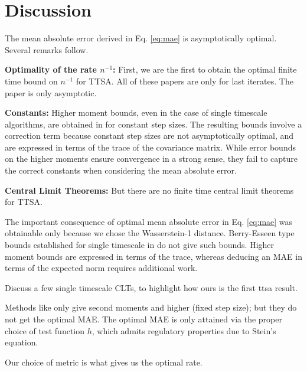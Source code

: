\section{Discussion}
The mean absolute error derived in Eq. \eqref{eq:mae} is asymptotically optimal. 
Several remarks follow. 


\textbf{Optimality of the rate $n^{-1}$:} %
First, we are the first to obtain the optimal finite time bound on $n^{-1}$ for TTSA. 
All of these papers \citep{kaledin2020finite,dalal2018finite} are only for last iterates. 
The paper \citep{mokkadem2006convergence} is only asymptotic. 


\textbf{Constants:} %
Higher moment bounds, even in the case of single timescale algorithms, are obtained in \citep{srikant2019,wainwrightBartlettJordan,durmus2024finite} for constant step sizes. 
The resulting bounds involve a correction term because constant step sizes are not asymptotically optimal, and are expressed in terms of the trace of the covariance matrix. 
While error bounds on the higher moments ensure convergence in a strong sense, they fail to capture the correct constants when considering the mean absolute error. 



\textbf{Central Limit Theorems:} %
But there are no finite time central limit theorems for TTSA.
\citet{samsonov2024gaussian,srikant2024CLT}


The important consequence of optimal mean absolute error in Eq. \eqref{eq:mae} was obtainable only because we chose the Wasserstein-1 distance. 
Berry-Esseen type bounds established for single timescale in \citep{samsonov2024gaussian} do not give such bounds. 
Higher moment bounds \citep{durmus2024finite} are expressed in terms of the trace, whereas deducing an MAE in terms of the expected norm requires additional work. 


{\color{red}
Discuss a few single timescale CLTs, to highlight how ours is the first ttsa result.

Methods like \citep{durmus2024finite} only give second moments and higher (fixed step size); but they do not get the optimal MAE.
The optimal MAE is only attained via the proper choice of test function $h$, which admits regulatory properties due to Stein's equation.

Our choice of metric is what gives us the optimal rate.
}


